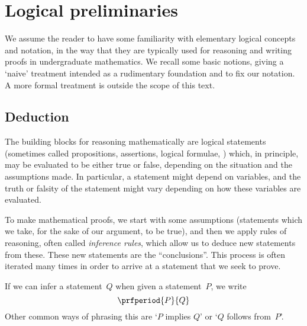 
\section{Logical preliminaries}
\label{sec:logical-prelim}


We assume the reader to have some familiarity with elementary logical concepts and notation, in the way that they are typically used for reasoning and writing proofs in undergraduate mathematics.
We recall some basic notions, giving a `naive' treatment intended as a rudimentary foundation and to fix our notation.
A more formal treatment is outside the scope of this text.


\subsection{Deduction}

The building blocks for reasoning mathematically are logical statements (sometimes called propositions, assertions, logical formulae, \etc) which, in principle, may be evaluated to be either true or false, depending on the situation and the assumptions made.
In particular, a statement might depend on variables, and the truth or falsity of the statement might vary depending on how these variables are evaluated.

To make mathematical proofs, we start with some assumptions (statements which we take, for the sake of our argument, to be true), and then we apply rules of reasoning, often called \emph{inference rules}, which allow us to deduce new statements from these.
These new statements are the ``conclusions''.
This process is often iterated many times in order to arrive at a statement that we seek to prove.

If we can infer a statement~$Q$ when given a statement~$P$, we write
\begin{equation}
    \prfperiod
    {P}{Q}
\end{equation}
Other common ways of phrasing this are `$P$ implies $Q$' or `$Q$ follows from~$P$'.

